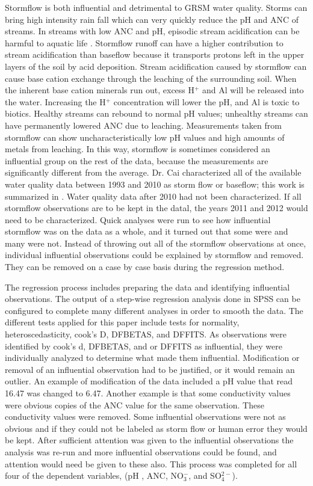 Stormflow is both influential and detrimental  to GRSM water quality. Storms can bring high intensity rain fall which can very quickly reduce the pH and ANC of streams. In streams with low ANC and pH, episodic stream acidification can be harmful to aquatic life \citep{neff2009physiological}.  Stormflow runoff can have a higher contribution to stream acidification than baseflow because it transports protons left in the upper layers of the soil by acid deposition. Stream acidification caused by stormflow can cause base cation exchange through the leaching of the surrounding soil. When the inherent base cation minerals run out, excess H$^+$ and Al will be released into the water. Increasing the H$^+$ concentration will lower the pH, and Al is toxic to biotics. Healthy streams can rebound to normal pH values; unhealthy streams can have permanently lowered ANC due to leaching.  Measurements taken from stormflow can show uncharacteristically low pH values and high amounts of metals from leaching. In this way, stormflow is sometimes considered an influential group on the rest of the data, because the measurements are significantly different from the average. Dr. Cai characterized all of the available water quality data between 1993 and 2010 as storm flow or baseflow; this work is summarized in \citet{cai2012}. Water quality data after 2010 had not been characterized. If all stormflow observations are to be kept in the datal, the years 2011 and 2012 would need to be characterized. Quick analyses were run to see how influential stormflow was on the data as a whole, and it turned out that some were and many were not. Instead of throwing out all of the stormflow observations at once, individual influential observations could be explained by stormflow and removed. They can be removed on a case by case basis during the regression method.

The regression process includes preparing the data and identifying influential observations. The output of a step-wise regression analysis done in SPSS can be configured to complete many different analyses in order to smooth the data. The different tests applied for this paper include tests for normality, heteroscedasticity, cook's D, DFBETAS, and DFFITS. As observations were identified by cook's d, DFBETAS, and or DFFITS as influential, they were individually analyzed to determine what made them influential. Modification or removal of an influential observation had to be justified, or it would remain an outlier. An example of modification of the data included a pH value that read 16.47 was changed to 6.47. Another example is that some conductivity values were obvious copies of the ANC value for the same observation. These conductivity values were removed. Some influential observations were not as obvious and if they could not be labeled as storm flow or human error they would be kept. After sufficient attention was given to the influential observations the analysis was re-run and more influential observations could be found, and attention would need be given to these also. This process was completed for all four of the dependent variables, (pH , ANC, NO$_3^-$, and SO$_4^{2-}$).
 
